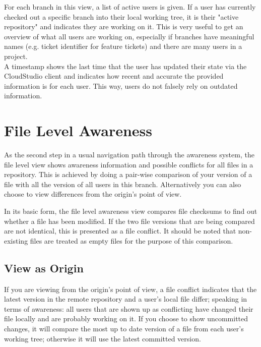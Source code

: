 For each branch in this view, a list of active users is given. If a user has currently checked out a specific branch into their local working tree, it is their "active repository" and indicates they are working on it. This is very useful to get an overview of what all users are working on, especially if branches have meaningful names (e.g. ticket identifier for feature tickets) and there are many users in a project. \\

A timestamp shows the last time that the user has updated their state via the CloudStudio client and indicates how recent and accurate the provided information is for each user. This way, users do not falsely rely on outdated information.






\section{File Level Awareness}

As the second step in a usual navigation path through the awareness system, the file level view shows awareness information and possible conflicts for all files in a repository. This is achieved by doing a pair-wise comparison of your version of a file with all the version of all users in this branch. Alternatively you can also choose to view differences from the origin's point of view.

In its basic form, the file level awareness view compares file checksums to find out whether a file has been modified. If the two file versions that are being compared are not identical, this is presented as a file conflict. It should be noted that non-existing files are treated as empty files for the purpose of this comparison.


\subsection{View as Origin}

If you are viewing from the origin's point of view, a file conflict indicates that the latest version in the remote repository and a user's local file differ; speaking in terms of awareness: all users that are shown up as conflicting have changed their file locally and are probably working on it. If you choose to show uncommitted changes, it will compare the most up to date version of a file from each user's working tree; otherwise it will use the latest committed version. \\

